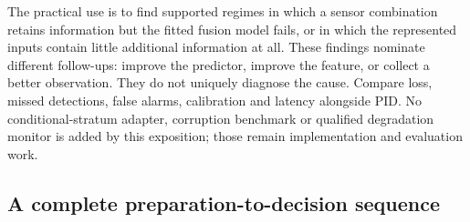 \documentclass[11pt,a4paper]{article}
\begin{document}
The practical use is to find supported regimes in which a sensor combination retains information but the fitted fusion model fails, or in which the represented inputs contain little additional information at all. These findings nominate different follow-ups: improve the predictor, improve the feature, or collect a better observation. They do not uniquely diagnose the cause. Compare loss, missed detections, false alarms, calibration and latency alongside PID. No conditional-stratum adapter, corruption benchmark or qualified degradation monitor is added by this exposition; those remain implementation and evaluation work.

\par{}

\subsection{A complete preparation-to-decision sequence}\label{a-complete-preparation-to-decision-sequence}
\end{document}
